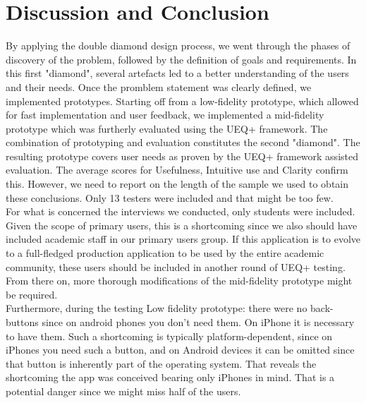 \documentclass[a4paper, 11pt]{article}
\begin{document}
\newpage
\section{Discussion and Conclusion}

By applying the double diamond design process, we went through the phases of discovery of the problem, followed by the definition of goals and requirements. In this first "diamond", several artefacts led to a better understanding of the users and their needs. Once the promblem statement was clearly defined, we implemented prototypes. Starting off from a low-fidelity prototype, which allowed for fast implementation and user feedback, we implemented a mid-fidelity prototype which was furtherly evaluated using the UEQ+ framework. The combination of prototyping and evaluation constitutes the second "diamond". The resulting prototype covers user needs as proven by the UEQ+ framework assisted evaluation. The average scores for Usefulness, Intuitive use and Clarity confirm this. However, we need to report on the length of the sample we used to obtain these conclusions. Only 13 testers were included and that might be too few.\\

For what is concerned the interviews we conducted, only students were included. Given the scope of primary users, this is a shortcoming since we also should have included academic staff in our primary users group. If this application is to evolve to a full-fledged production application to be used by the entire academic community, these users should be included in another round of UEQ+ testing. From there on, more thorough modifications of the mid-fidelity prototype might be required.\\

Furthermore, during the testing Low fidelity prototype: there were no back-buttons since on android phones you don't need them. On iPhone it is necessary to have them. Such a shortcoming is typically platform-dependent, since on iPhones you need such a button, and on Android devices it can be omitted since that button is inherently part of the operating system. That reveals the shortcoming the app was conceived bearing only iPhones in mind. That is a potential danger since we might miss half of the users.\\
\end{document}
